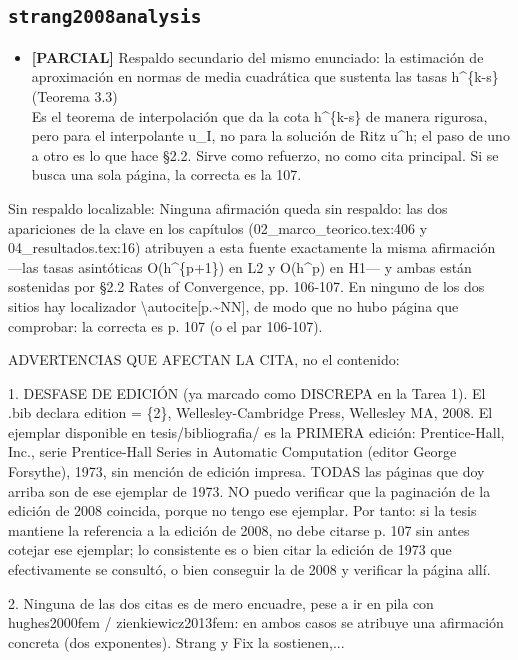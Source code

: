 \documentclass[11pt,a4paper]{article}
\newcommand{\campo}[1]{\textcolor{gris}{\footnotesize #1}}
\begin{document}
\subsection{\texttt{strang2008analysis}}
\begin{itemize}\small
\item \textbf{[PARCIAL]} Respaldo secundario del mismo enunciado: la estimación de aproximación en normas de media cuadrática que sustenta las tasas h\textasciicircum{}\{k-s\} (Teorema 3.3)
\\ \campo{Es el teorema de interpolación que da la cota h\textasciicircum{}\{k-s\} de manera rigurosa, pero para el interpolante u\_I, no para la solución de Ritz u\textasciicircum{}h; el paso de uno a otro es lo que hace §2.2. Sirve como refuerzo, no como cita principal. Si se busca una sola página, la correcta es la 107.}
\end{itemize}
{\small\campo{Sin respaldo localizable:} Ninguna afirmación queda sin respaldo: las dos apariciones de la clave en los capítulos (02\_marco\_teorico.tex:406 y 04\_resultados.tex:16) atribuyen a esta fuente exactamente la misma afirmación ---las tasas asintóticas O(h\textasciicircum{}\{p+1\}) en L2 y O(h\textasciicircum{}p) en H1--- y ambas están sostenidas por §2.2 \textquotedbl{}Rates of Convergence\textquotedbl{}, pp. 106-107. En ninguno de los dos sitios hay localizador \textbackslash{}autocite[p.\textasciitilde{}NN], de modo que no hubo página que comprobar: la correcta es p. 107 (o el par 106-107).

ADVERTENCIAS QUE AFECTAN LA CITA, no el contenido:

1. DESFASE DE EDICIÓN (ya marcado como DISCREPA en la Tarea 1). El .bib declara edition = \{2\}, Wellesley-Cambridge Press, Wellesley MA, 2008. El ejemplar disponible en tesis/bibliografia/ es la PRIMERA edición: Prentice-Hall, Inc., serie Prentice-Hall Series in Automatic Computation (editor George Forsythe), 1973, sin mención de edición impresa. TODAS las páginas que doy arriba son de ese ejemplar de 1973. NO puedo verificar que la paginación de la edición de 2008 coincida, porque no tengo ese ejemplar. Por tanto: si la tesis mantiene la referencia a la edición de 2008, no debe citarse \textquotedbl{}p. 107\textquotedbl{} sin antes cotejar ese ejemplar; lo consistente es o bien citar la edición de 1973 que efectivamente se consultó, o bien conseguir la de 2008 y verificar la página allí.

2. Ninguna de las dos citas es de mero encuadre, pese a ir en pila con hughes2000fem / zienkiewicz2013fem: en ambos casos se atribuye una afirmación concreta (dos exponentes). Strang y Fix la sostienen,...\par}
\end{document}
